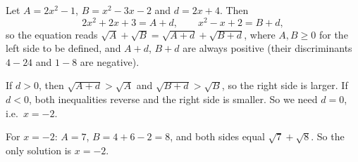 Let $A=2x^2-1$, $B=x^2-3x-2$ and $d=2x+4$. Then
\[
2x^2+2x+3=A+d,\qquad x^2-x+2=B+d,
\]
so the equation reads $\sqrt A+\sqrt B=\sqrt{A+d}+\sqrt{B+d}$, where $A,B\ge0$ for the left side to be defined, and $A+d$, $B+d$ are always positive (their discriminants $4-24$ and $1-8$ are negative).

If $d>0$, then $\sqrt{A+d}>\sqrt A$ and $\sqrt{B+d}>\sqrt B$, so the right side is larger. If $d<0$, both inequalities reverse and the right side is smaller. So we need $d=0$, i.e.\ $x=-2$.

For $x=-2$: $A=7$, $B=4+6-2=8$, and both sides equal $\sqrt7+\sqrt8$. So the only solution is $\boxed{x=-2}$.
